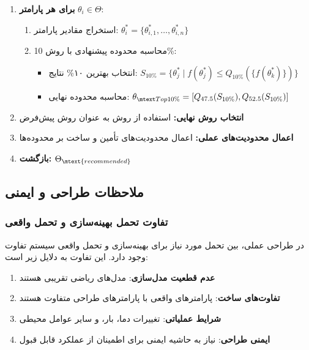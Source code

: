 \begin{enumerate}
    \item \textbf{برای هر پارامتر} $\theta_i \in \Theta$:
    \begin{enumerate}
        \item استخراج مقادیر پارامتر: $\theta_i^* = \{\theta_{i,1}^*, \dots, \theta_{i,n}^*\}$
        \item محاسبه محدوده پیشنهادی با روش  10\%:
        \begin{itemize}
            \item انتخاب بهترین ۱۰\% نتایج: $S_{10\%} = \{\theta^*_j \mid f(\theta^*_j) \leq Q_{10\%}(\{f(\theta^*_k)\})\}$
            \item محاسبه محدوده نهایی: $\theta_{\mtext{Top10\%}} = [Q_{47.5}(S_{10\%}), Q_{52.5}(S_{10\%})]$
        \end{itemize}
    \end{enumerate}

    \item \textbf{انتخاب روش نهایی:} استفاده از روش  به عنوان روش پیش‌فرض

    \item \textbf{اعمال محدودیت‌های عملی:} اعمال محدودیت‌های تأمین و ساخت بر محدوده‌ها

    \item \textbf{بازگشت:} $\Theta_{\mtext{recommended}}$
\end{enumerate}

\subsection{ملاحظات طراحی و ایمنی}

\subsubsection{تفاوت تحمل بهینه‌سازی و تحمل واقعی}

در طراحی عملی، بین تحمل مورد نیاز برای بهینه‌سازی و تحمل واقعی سیستم تفاوت وجود دارد. این تفاوت به دلایل زیر است:

\begin{enumerate}
    \item \textbf{عدم قطعیت مدل‌سازی}: مدل‌های ریاضی تقریبی هستند
    \item \textbf{تفاوت‌های ساخت}: پارامترهای واقعی با پارامترهای طراحی متفاوت هستند
    \item \textbf{شرایط عملیاتی}: تغییرات دما، بار، و سایر عوامل محیطی
    \item \textbf{ایمنی طراحی}: نیاز به حاشیه ایمنی برای اطمینان از عملکرد قابل قبول
\end{enumerate}


